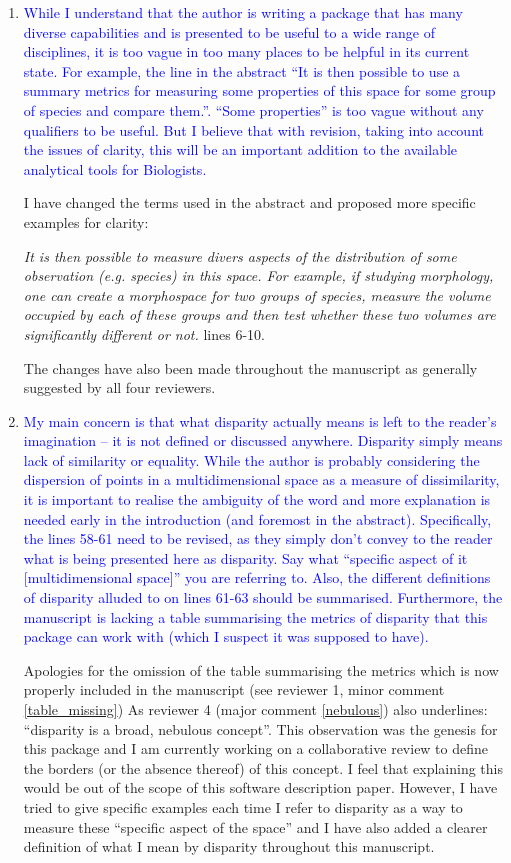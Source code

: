 \documentclass[12pt,letterpaper]{article}
\begin{document}
\begin{enumerate}

\item{\textcolor{blue}{While I understand that the author is writing a package that has many diverse capabilities and is presented to be useful to a wide range of disciplines, it is too vague in too many places to be helpful in its current state.
For example, the line in the abstract “It is then possible to use a summary metrics for measuring some properties of this space for some group of species and compare them.”.
“Some properties” is too vague without any qualifiers to be useful. But I believe that with revision, taking into account the issues of clarity, this will be an important addition to the available analytical tools for Biologists.}}

I have changed the terms used in the abstract and proposed more specific examples for clarity:

\textit{It is then possible to measure divers aspects of the distribution of some observation (e.g. species) in this space. For example, if studying morphology, one can create a morphospace for two groups of species, measure the volume occupied by each of these groups and then test whether these two volumes are significantly different or not.} lines 6-10.

The changes have also been made throughout the manuscript as generally suggested by all four reviewers.

\item{\textcolor{blue}{My main concern is that what disparity actually means is left to the reader’s imagination – it is not defined or discussed anywhere.
Disparity simply means lack of similarity or equality.
While the author is probably considering the dispersion of points in a multidimensional space as a measure of dissimilarity, it is important to realise the ambiguity of the word and more explanation is needed early in the introduction (and foremost in the abstract).
Specifically, the lines 58-61 need to be revised, as they simply don’t convey to the reader what is being presented here as disparity.
Say what “specific aspect of it [multidimensional space]” you are referring to.
Also, the different definitions of disparity alluded to on lines 61-63 should be summarised.
Furthermore, the manuscript is lacking a table summarising the metrics of disparity that this package can work with (which I suspect it was supposed to have).}}
\label{define_disparity}

Apologies for the omission of the table summarising the metrics which is now properly included in the manuscript (see reviewer 1, minor comment \ref{table_missing})
As reviewer 4 (major comment \ref{nebulous}) also underlines: ``disparity is a broad, nebulous concept''.
This observation was the genesis for this package and I am currently working on a collaborative review to define the borders (or the absence thereof) of this concept.
I feel that explaining this would be out of the scope of this software description paper.
However, I have tried to give specific examples each time I refer to disparity as a way to measure these ``specific aspect of the space'' and I have also added a clearer definition of what I mean by disparity throughout this manuscript.


\end{enumerate}
\end{document}

